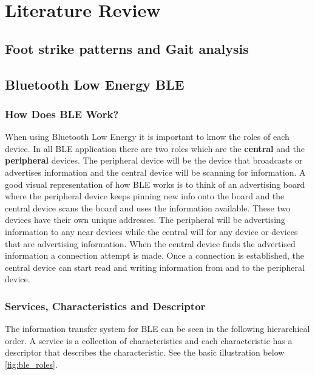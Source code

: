 \graphicspath{{litreview/fig/}}

\chapter{Literature Review}
\label{chap:litreview}
\section{Foot strike patterns and Gait analysis}
\label{sec:Gait}


\section{Bluetooth Low Energy BLE}
\label{sec:ble}

\subsection{How Does BLE Work?}
\label{sec:howdoesblework}

When using Bluetooth Low Energy it is important to know the roles of each device. In all BLE application there are two roles which are the \textbf{central} and the \textbf{peripheral} devices. The peripheral device will be the device that broadcasts or advertises information and the central device will be scanning for information. A good visual representation of how BLE works is to think of an advertising board where the peripheral device keeps pinning new info onto the board and the central device scans the board and uses the information available. These two devices have their own unique addresses. The peripheral will be advertising information to any near devices while the central will for any device or devices that are advertising information. When the central device finds the advertised information a connection attempt is made. Once a connection is established, the central device can start read and writing information from and to the peripheral device.

\subsection{Services, Characteristics and Descriptor}
\label{sec:servicesandcharacteristics}
 The information transfer system for BLE can be seen in the following hierarchical order. A service is a collection of characteristics and each characteristic has a descriptor that describes the characteristic. See the basic illustration below \ref{fig:ble_roles}.

